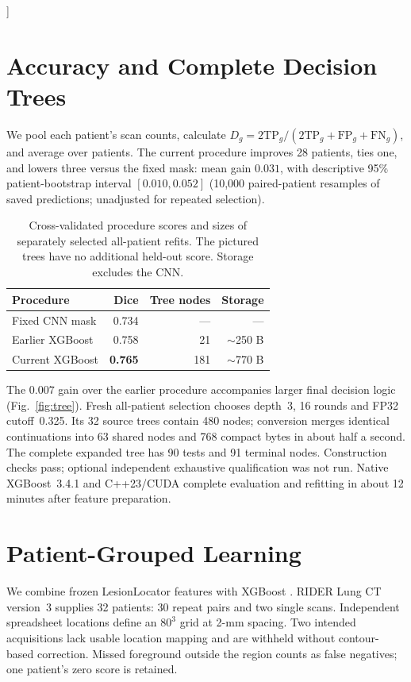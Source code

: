 \vskip 0.06in
]
\printAffiliationsAndNotice{}
\section{Accuracy and Complete Decision Trees}
We pool each patient's scan counts, calculate $D_g=2\mathrm{TP}_g/(2\mathrm{TP}_g+\mathrm{FP}_g+\mathrm{FN}_g)$, and average over patients. The current procedure improves 28 patients, ties one, and lowers three versus the fixed mask: mean gain $0.031$, with descriptive 95\% patient-bootstrap interval $[0.010,0.052]$ (10,000 paired-patient resamples of saved predictions; unadjusted for repeated selection).

\begin{table}[h]
\caption{Cross-validated procedure scores and sizes of separately selected all-patient refits. The pictured trees have no additional held-out score. Storage excludes the CNN.}
\label{tab:performance}
\centering\small
\begin{tabular}{lrrr}
\toprule
Procedure & Dice & Tree nodes & Storage\\
\midrule
Fixed CNN mask & 0.734 & --- & ---\\
Earlier XGBoost & 0.758 & 21 & $\sim$250 B\\
Current XGBoost & \textbf{0.765} & 181 & $\sim$770 B\\
\bottomrule
\end{tabular}
\end{table}

The $0.007$ gain over the earlier procedure accompanies larger final decision logic (Fig.~\ref{fig:tree}). Fresh all-patient selection chooses depth~3, 16 rounds and FP32 cutoff~0.325. Its 32 source trees contain 480 nodes; conversion merges identical continuations into 63 shared nodes and 768 compact bytes in about half a second. The complete expanded tree has 90 tests and 91 terminal nodes. Construction checks pass; optional independent exhaustive qualification was not run. Native XGBoost~3.4.1 and C++23/CUDA complete evaluation and refitting in about 12 minutes after feature preparation.


\clearpage
\section{Patient-Grouped Learning}
We combine frozen LesionLocator features \citep{rokuss2025} with XGBoost \citep{chen2016}. RIDER Lung CT version~3 \citep{riderdata,zhao2024} supplies 32 patients: 30 repeat pairs and two single scans. Independent spreadsheet locations define an $80^3$ grid at 2-mm spacing. Two intended acquisitions lack usable location mapping and are withheld without contour-based correction. Missed foreground outside the region counts as false negatives; one patient's zero score is retained.

